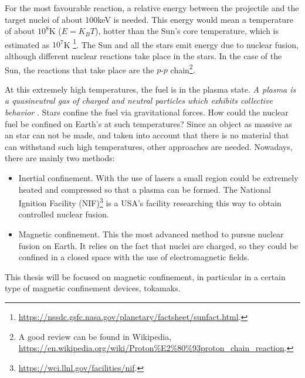 \documentclass[a4paper,12pt,oneside]{book}
\begin{document}
For the most favourable reaction, a relative energy between the projectile and the target nuclei of about 100keV is needed. This energy would mean a temperature of about $10^8$K ($E=K_B T$), hotter than the Sun's core temperature, which is estimated as $10^7$K \footnote{\url{https://nssdc.gsfc.nasa.gov/planetary/factsheet/sunfact.html}.}. The Sun and all the stars emit energy due to nuclear fusion, although different nuclear reactions take place in the stars. In the case of the Sun, the reactions that take place are the $p$-$p$ chain\footnote{A good review can be found in Wikipedia, \url{https://en.wikipedia.org/wiki/Proton\%E2\%80\%93proton\_chain\_reaction}.}.

At this extremely high temperatures, the fuel is in the plasma state. \textit{A plasma is a quasineutral gas of charged and neutral particles which exhibits
collective behavior} \cite{Chen}. Stars confine the fuel via gravitational forces. How could the nuclear fuel be confined on Earth's at such temperatures? Since an object as massive as an star can not be made, and taken into account that there is no material that can withstand such high temperatures, other approaches are needed. Nowadays, there are mainly two methods:
%
\begin{itemize}
\item Inertial confinement. With the use of lasers a small region could be extremely heated and compressed so that a plasma can be formed. The National Ignition Facility (NIF)\footnote{\url{https://wci.llnl.gov/facilities/nif}.} is a USA's facility researching this way to obtain controlled nuclear fusion.
\item Magnetic confinement. This the most advanced method to pursue nuclear fusion on Earth. It relies on the fact that nuclei are charged, so they could be confined in a closed space with the use of electromagnetic fields.
\end{itemize}
This thesis will be focused on magnetic confinement, in particular in a certain type of magnetic confinement devices, tokamaks.
\end{document}
